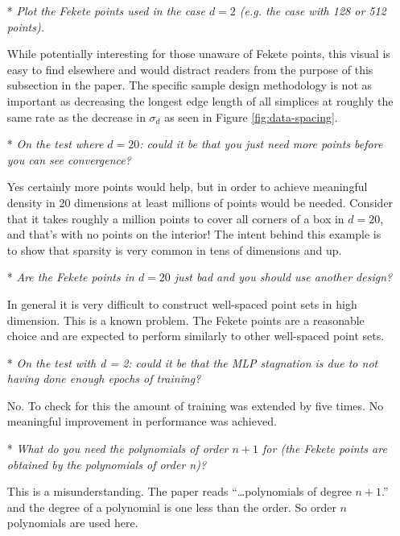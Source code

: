\begin{itemize}[leftmargin=.5cm]
\item[*] {\it Plot the Fekete points used in the case $d = 2$ (e.g. the case with 128 or 512 points).}\vspace{.2cm}

While potentially interesting for those unaware of Fekete points, this visual is easy to find elsewhere and would distract readers from the purpose of this subsection in the paper. The specific sample design methodology is not as important as decreasing the longest edge length of all simplices at roughly the same rate as the decrease in $\sigma_d$ as seen in Figure \ref{fig:data-spacing}.

\newpage\setcounter{page}{0}\thispagestyle{empty}
\item[*] {\it On the test where $d = 20$: could it be that you just need more points before you can see convergence?}\vspace{.2cm}

Yes certainly more points would help, but in order to achieve meaningful density in 20 dimensions at least millions of points would be needed. Consider that it takes roughly a million points to cover all corners of a box in $d = 20$, and that's with no points on the interior! The intent behind this example is to show that sparsity is very common in tens of dimensions and up.

\item[*] {\it Are the Fekete points in $d = 20$ just bad and you should use another design?}\vspace{.2cm}

In general it is very difficult to construct well-spaced point sets in high dimension. This is a known problem. The Fekete points are a reasonable choice and are expected to perform similarly to other well-spaced point sets.

\item[*] {\it On the test with d = 2: could it be that the MLP stagnation is due to not having done enough epochs of training?}\vspace{.2cm}

No. To check for this the amount of training was extended by five times. No meaningful improvement in performance was achieved.

\item[*] {\it What do you need the polynomials of order $n+1$ for (the Fekete points are obtained by the polynomials of order n)?}\vspace{.2cm}

This is a misunderstanding. The paper reads ``\ldots polynomials of \color{red}degree \color{black} $n+1$.'' and the degree of a polynomial is one less than the order. So order $n$ polynomials are used here.


\end{itemize}
